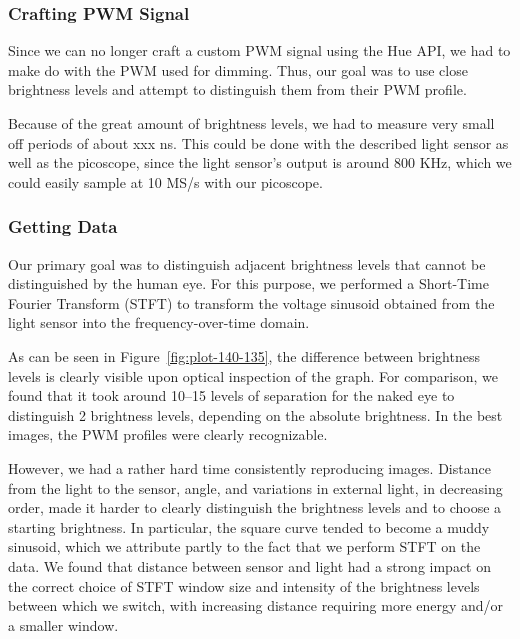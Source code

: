 \subsubsection{Crafting PWM Signal}

Since we can no longer craft a custom PWM signal using the Hue API, we had to make do with the PWM used for dimming.
Thus, our goal was to use close brightness levels and attempt to distinguish them from their PWM profile.

Because of the great amount of brightness levels, we had to measure very small off periods of about xxx ns. This could be done with the described light sensor as well as the picoscope, since the light sensor's output is around 800 KHz, which we could easily sample at 10 MS/s with our picoscope.

\subsubsection{Getting Data}
Our primary goal was to distinguish adjacent brightness levels that cannot be distinguished by the human eye.
For this purpose, we performed a Short-Time Fourier Transform (STFT) to transform the voltage sinusoid obtained from the light sensor into the frequency-over-time domain.

As can be seen in Figure~\ref{fig:plot-140-135}, the difference between brightness levels is clearly visible upon optical inspection of the graph.
For comparison, we found that it took around 10--15 levels of separation for the naked eye to distinguish 2 brightness levels, depending on the absolute brightness.
In the best images, the PWM profiles were clearly recognizable.

However, we had a rather hard time consistently reproducing images.
Distance from the light to the sensor, angle, and variations in external light, in decreasing order, made it harder to clearly distinguish the brightness levels and to choose a starting brightness.
In particular, the square curve tended to become a muddy sinusoid, which we attribute partly to the fact that we perform STFT on the data.
We found that distance between sensor and light had a strong impact on the correct choice of STFT window size and intensity of the brightness levels between which we switch, with increasing distance requiring more energy and/or a smaller window.

